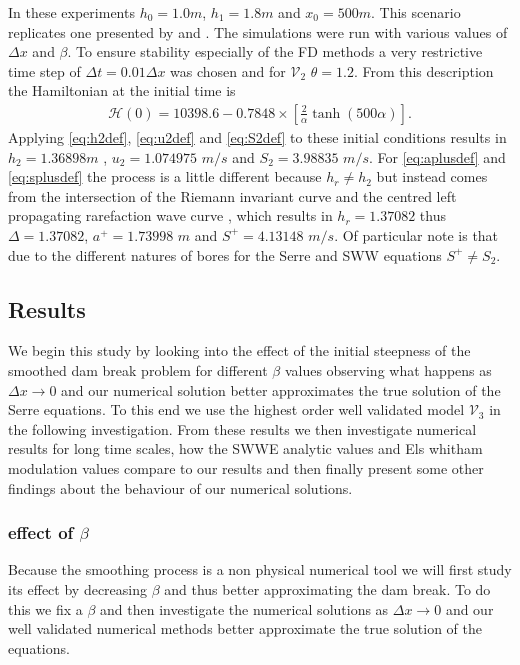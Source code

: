 \documentclass[SingleSpace,12pt,Proceedings]{Serre_ASCE}
\begin{document}
In these experiments $h_0 = 1.0m$, $h_1 = 1.8m$ and $x_0 = 500m$. This scenario replicates one presented by  and . The simulations were run with various values of $\Delta x$ and $\beta$. To ensure stability especially of the FD methods a very restrictive time step of $\Delta t = 0.01 \Delta x$ was chosen and for $\mathcal{V}_2$ $\theta = 1.2$. From this description the Hamiltonian at the initial time is
\begin{gather}
\label{eqn:HamilDBinit}
\mathcal{H} (0) = 10398.6 - 0.7848\times\left[\frac{2}{\alpha} \tanh\left(500 \alpha\right)\right].
\end{gather} 
Applying \eqref{eq:h2def}, \eqref{eq:u2def} and \eqref{eq:S2def} to these initial conditions results in $h_2 = 1.36898m$ , $u_2 = 1.074975$ $m/s$ and $S_2 = 3.98835$ $m/s$. For \eqref{eq:aplusdef} and \eqref{eq:splusdef} the process is a little different because $h_r \neq h_2$ but instead comes from the intersection of the Riemann invariant curve and the centred left propagating rarefaction wave curve \cite{El-etal-2006}, which results in $h_r = 1.37082$ thus $\Delta = 1.37082$,  $a^+ = 1.73998$ $m$ and $S^+ = 4.13148$ $m/s$. Of particular note is that due to the different natures of bores for the Serre and SWW equations $S^+ \neq S_2$.




\subsection{Results}

We begin this study by looking into the effect of the initial steepness of the smoothed dam break problem for different $\beta$ values observing what happens as $\Delta x \rightarrow 0$ and our numerical solution better approximates the true solution of the Serre equations. To this end we use the highest order well validated model $\mathcal{V}_3$ in the following investigation. From these results we then investigate numerical results for long time scales, how the SWWE analytic values and Els whitham modulation values compare to our results and then finally present some other findings about the behaviour of our numerical solutions.

\subsubsection{effect of $\beta$}
Because the smoothing process is a non physical numerical tool we will first study its effect by decreasing $\beta$ and thus better approximating the dam break. To do this we fix a $\beta$ and then investigate the numerical solutions as $\Delta x \rightarrow 0$ and our well validated numerical methods better approximate the true solution of the equations. %
\end{document}
